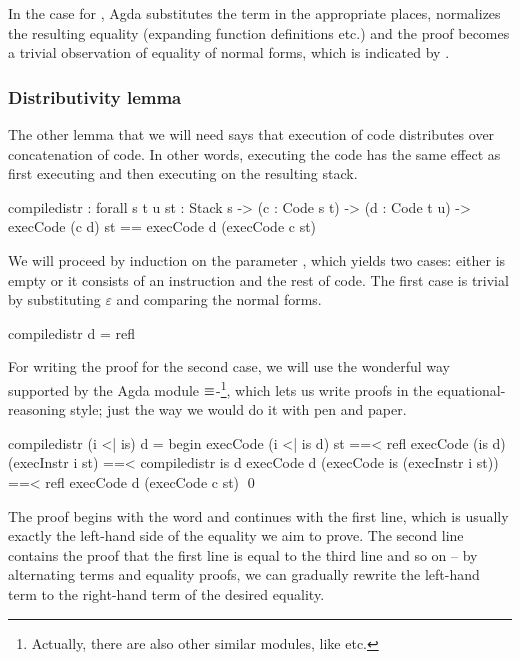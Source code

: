 \noindent In the case for , Agda substitutes the term 
in the appropriate places, normalizes the resulting equality (expanding
function definitions etc.) and the proof becomes a trivial observation of
equality of normal forms, which is indicated by .

\subsubsection{Distributivity lemma}

The other lemma that we will need says that execution of code distributes over
concatenation of code. In other words, executing the code  has the same effect as first executing  and then executing
 on the resulting stack.

\label{sec:cor-compile-distr}\begin{code}
  compile\-distr : forall {s t u} {st : Stack s}
    -> (c : Code s t) -> (d : Code t u)
    -> execCode (c \app d) st == execCode d (execCode c st)
\end{code}

\noindent We will proceed by induction on the parameter , which yields
two cases: either  is empty or it consists of an instruction and the
rest of code. The first case is trivial by substituting $\varepsilon$ and
comparing the normal forms.

\begin{code}
  compile\-distr \nil d = refl
\end{code}

\noindent For writing the proof for the second case, we will use the wonderful
way supported by the Agda module $\mathsf{\equiv}$-\footnote{Actually,
there are also other similar modules, like  etc.}, which
lets us write proofs in the equational-reasoning style; just the way we would
do it with pen and paper.

\begin{code}
  compile\-distr (i <| is) d = begin
    execCode (i <| is \app d) st
      ==< refl \>
    execCode (is \app d) (execInstr i st)
      ==< compile\-distr is d \>
    execCode d (execCode is (execInstr i st))
      ==< refl \>
    execCode d (execCode c st)
    \qed
\end{code}

\noindent The proof begins with the word  and continues with the
first line, which is usually exactly the left-hand side of the equality we aim
to prove.  The second line contains the proof that the first line is equal to
the third line and so on -- by alternating terms and equality proofs, we can
gradually rewrite the left-hand term to the right-hand term of the desired
equality.

